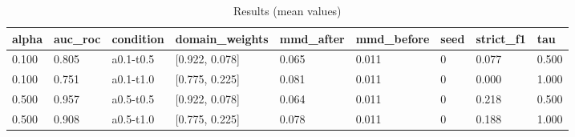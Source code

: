 \begin{table}[h]
\centering
\caption{Results (mean values)}
\label{tab:res}
\begin{tabular}{lllllllll}
\toprule
alpha & auc\_roc & condition & domain\_weights & mmd\_after & mmd\_before & seed & strict\_f1 & tau \\
\midrule
0.100 & 0.805 & a0.1-t0.5 & [0.922, 0.078] & 0.065 & 0.011 & 0 & 0.077 & 0.500 \\
0.100 & 0.751 & a0.1-t1.0 & [0.775, 0.225] & 0.081 & 0.011 & 0 & 0.000 & 1.000 \\
0.500 & 0.957 & a0.5-t0.5 & [0.922, 0.078] & 0.064 & 0.011 & 0 & 0.218 & 0.500 \\
0.500 & 0.908 & a0.5-t1.0 & [0.775, 0.225] & 0.078 & 0.011 & 0 & 0.188 & 1.000 \\
\bottomrule
\end{tabular}
\end{table}
